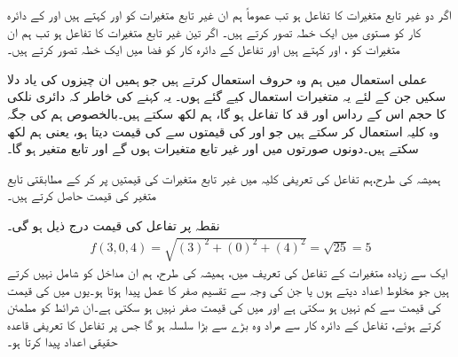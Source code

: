 اگر  دو غیر تابع متغیرات کا تفاعل ہو تب عموماً ہم  ان غیر تابع متغیرات کو  اور  کہتے ہیں اور  کے دائرہ کار  کو مستوی  میں ایک خطہ تصور کرتے ہیں۔ اگر  تین غیر تابع متغیرات کا تفاعل ہو تب ہم  ان متغیرات کو ،  اور  کہتے ہیں اور تفاعل کے  دائرہ کار کو فضا میں ایک خطہ تصور کرتے ہیں۔

عملی استعمال میں ہم  وہ حروف استعمال کرتے ہیں جو ہمیں ان چیزوں  کی یاد  دلا سکیں جن کے لئے یہ متغیرات استعمال  کیے گئے ہوں۔ یہ  کہنے  کی خاطر کہ دائری نلکی کا حجم اس کے رداس   اور قد    کا تفاعل ہو گا، ہم  لکھ سکتے ہیں۔بالخصوص  ہم  کی جگہ وہ کلیہ استعمال کر سکتے ہیں جو  اور  کی قیمتوں سے  کی  قیمت دیتا ہو، یعنی ہم   لکھ سکتے ہیں۔دونوں صورتوں میں  اور  غیر تابع متغیرات ہوں گے اور  تابع متغیر ہو گا۔

ہمیشہ کی طرح،ہم  تفاعل کی تعریفی کلیہ میں غیر تابع متغیرات کی قیمتیں پر کر  کے مطابقتی تابع متغیر کی قیمت حاصل کرتے ہیں۔

نقطہ  پر تفاعل  کی قیمت درج ذیل ہو گی۔
\begin{align*}
f(3,0,4)=\sqrt{(3)^2+(0)^2+(4)^2}=\sqrt{25}=5
\end{align*}
ایک سے زیادہ متغیرات کے تفاعل  کی تعریف  میں، ہمیشہ کی طرح، ہم  ان مداخل کو  شامل نہیں  کرتے ہیں  جو مخلوط اعداد دیتے ہوں یا جن کی وجہ سے   تقسیم صفر  کا عمل  پیدا ہوتا ہو۔یوں  میں  کی قیمت  کی قیمت سے کم نہیں ہو سکتی ہے اور  میں  کی قیمت صفر نہیں ہو سکتی ہے۔ان شرائط کو مطمئن کرتے ہوئے، تفاعل کے  دائرہ کار سے مراد  وہ بڑے سے بڑا سلسلہ ہو گا جس پر تفاعل کا  تعریفی قاعدہ حقیقی اعداد  پیدا کرتا ہو۔ 

